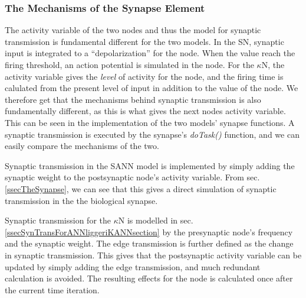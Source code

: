 		\subsubsection{The Mechanisms of the Synapse Element}
		The activity variable of the two nodes and thus the model for synaptic transmission is fundamental different for the two models.
		In the SN, synaptic input is integrated to a ``depolarization'' for the node.
		When the value reach the firing threshold, an action potential is simulated in the node.
		For the $\kappa$N, the activity variable gives the \emph{level} of activity for the node, 
			and the firing time is calulated from the present level of input in addition to the value of the node.
		We therefore get that the mechanisms behind synaptic transmission is also fundamentally different, as this is what gives the next nodes activity variable. %
		This can be seen in the implementation of the two models' synapse functions. 
		A synaptic transmission is executed by the synapse's \emph{doTask()} function, and we can easily compare the mechanisms of the two.

		Synaptic transmission in the SANN model is implemented by simply adding the synaptic weight to the postsynaptic node's activity variable.
		From sec. \ref{ssecTheSynapse}, we can see that this gives a direct simulation of synaptic transmission in the the biological synapse.

		Synaptic transmission for the $\kappa$N is modelled in sec. \ref{ssecSynTransForANNliggeriKANNsection} by the presynaptic node's frequency and the synaptic weight.
		The edge transmission is further defined as the change in synaptic transmission. %
		This gives that the postsynaptic activity variable can be updated by simply adding the edge transmission, and much redundant calculation is avoided.
		The resulting effects for the node is calculated once after the current time iteration.


